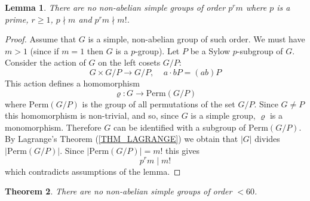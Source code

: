 \documentclass[12pt, letterpaper, oneside]{article}
\theoremstyle{plain}
\newtheorem{theorem}{Theorem}[section]
\newtheorem{lemma}[theorem]{Lemma}
\theoremstyle{definition}
\newcommand{\Perm}{\mathrm{Perm}}
\newcommand{\vs}{\vskip 5mm}
\begin{document}
\vs\vs

\begin{lemma}
\label{LEMMA_SIMPLEPRMGP}
There are no non-abelian simple groups of order $p^{r}m$ where $p$ is a prime, 
$r\geq 1$, $p\nmid m$ and $p^{r}m \nmid m!$.
\end{lemma}


\vs

\begin{proof}
Assume that $G$ is a simple, non-abelian group of such order. We must have $m > 1$
(since if $m=1$ then $G$ is a $p$-group). Let $P$ be a Sylow $p$-subgroup of $G$. 
Consider the action of $G$ on the left cosets $G/P$:
$$G\times G/P \to G/P, \ \ \ \ \ a\cdot bP = (ab)P$$ 
This action defines a homomorphism 
$$\varrho \colon G \to \Perm(G/P)$$ 
where $\Perm(G/P)$ is the group of all permutations of the set 
$G/P$. Since $G\neq P$ this homomorphism is non-trivial, and so, since $G$ is a simple group, 
$\varrho$ is a monomorphism. Therefore $G$ can be identified with a subgroup of 
$\Perm(G/P)$. By Lagrange's Theorem (\ref{THM_LAGRANGE}) we obtain that 
$|G|$ divides $|\Perm(G/P)|$. Since $|\Perm(G/P)| = m!$ this gives 
$$p^{r}m \mid m!$$
which contradicts assumptions of the lemma. 
\end{proof}


\vs\vs


\begin{theorem}
\label{THM_SIMPLEGPSLESS60}
There are no non-abelian simple groups of order  $<60$.
\end{theorem}

\vs
\end{document}
